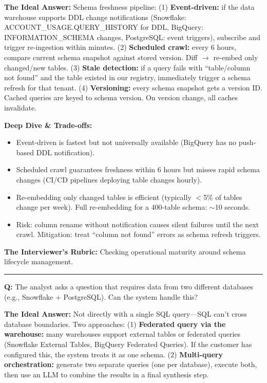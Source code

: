 \textbf{The Ideal Answer:} Schema freshness pipeline: (1) \textbf{Event-driven:} if the data warehouse supports DDL change notifications (Snowflake: ACCOUNT\_USAGE.QUERY\_HISTORY for DDL, BigQuery: INFORMATION\_SCHEMA changes, PostgreSQL: event triggers), subscribe and trigger re-ingestion within minutes. (2) \textbf{Scheduled crawl:} every 6 hours, compare current schema snapshot against stored version. Diff $\rightarrow$ re-embed only changed/new tables. (3) \textbf{Stale detection:} if a query fails with ``table/column not found'' and the table existed in our registry, immediately trigger a schema refresh for that tenant. (4) \textbf{Versioning:} every schema snapshot gets a version ID. Cached queries are keyed to schema version. On version change, all caches invalidate.

\textbf{Deep Dive \& Trade-offs:}
\begin{itemize}
  \item Event-driven is fastest but not universally available (BigQuery has no push-based DDL notification).
  \item Scheduled crawl guarantees freshness within 6 hours but misses rapid schema changes (CI/CD pipelines deploying table changes hourly).
  \item Re-embedding only changed tables is efficient (typically $<$5\% of tables change per week). Full re-embedding for a 400-table schema: $\sim$10 seconds.
  \item Risk: column rename without notification causes silent failures until the next crawl. Mitigation: treat ``column not found'' errors as schema refresh triggers.
\end{itemize}

\textbf{The Interviewer's Rubric:} Checking operational maturity around schema lifecycle management.

\bigskip\hrule\bigskip

\textbf{Q:} The analyst asks a question that requires data from two different databases (e.g., Snowflake + PostgreSQL). Can the system handle this?

\textbf{The Ideal Answer:} Not directly with a single SQL query---SQL can't cross database boundaries. Two approaches: (1) \textbf{Federated query via the warehouse:} many warehouses support external tables or federated queries (Snowflake External Tables, BigQuery Federated Queries). If the customer has configured this, the system treats it as one schema. (2) \textbf{Multi-query orchestration:} generate two separate queries (one per database), execute both, then use an LLM to combine the results in a final synthesis step.

